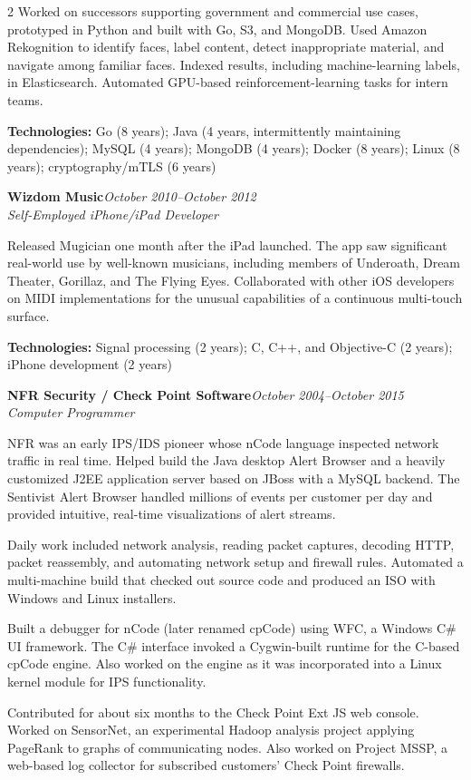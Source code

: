 \documentclass[10pt,letterpaper]{article}
\newcommand{\role}[3]{%
  \textbf{#1}\hfill\textit{#2}\\[-1pt]
  \textit{#3}\par
}
\newcommand{\tech}[1]{\small\textbf{Technologies:} #1\normalsize}
\begin{document}
\begin{paracol}{2}
Worked on successors supporting government and commercial use cases, prototyped in Python and built with Go, S3, and MongoDB. Used Amazon Rekognition to identify faces, label content, detect inappropriate material, and navigate among familiar faces. Indexed results, including machine-learning labels, in Elasticsearch. Automated GPU-based reinforcement-learning tasks for intern teams.

\tech{Go (8 years); Java (4 years, intermittently maintaining dependencies); MySQL (4 years); MongoDB (4 years); Docker (8 years); Linux (8 years); cryptography/mTLS (6 years)}

\role{Wizdom Music}{October 2010--October 2012}{Self-Employed iPhone/iPad Developer}
Released Mugician one month after the iPad launched. The app saw significant real-world use by well-known musicians, including members of Underoath, Dream Theater, Gorillaz, and The Flying Eyes. Collaborated with other iOS developers on MIDI implementations for the unusual capabilities of a continuous multi-touch surface.

\tech{Signal processing (2 years); C, C++, and Objective-C (2 years); iPhone development (2 years)}

\role{NFR Security / Check Point Software}{October 2004--October 2015}{Computer Programmer}
NFR was an early IPS/IDS pioneer whose nCode language inspected network traffic in real time. Helped build the Java desktop Alert Browser and a heavily customized J2EE application server based on JBoss with a MySQL backend. The Sentivist Alert Browser handled millions of events per customer per day and provided intuitive, real-time visualizations of alert streams.

Daily work included network analysis, reading packet captures, decoding HTTP, packet reassembly, and automating network setup and firewall rules. Automated a multi-machine build that checked out source code and produced an ISO with Windows and Linux installers.

Built a debugger for nCode (later renamed cpCode) using WFC, a Windows C\# UI framework. The C\# interface invoked a Cygwin-built runtime for the C-based cpCode engine. Also worked on the engine as it was incorporated into a Linux kernel module for IPS functionality.

Contributed for about six months to the Check Point Ext JS web console. Worked on SensorNet, an experimental Hadoop analysis project applying PageRank to graphs of communicating nodes. Also worked on Project MSSP, a web-based log collector for subscribed customers' Check Point firewalls.


\end{paracol}
\end{document}
